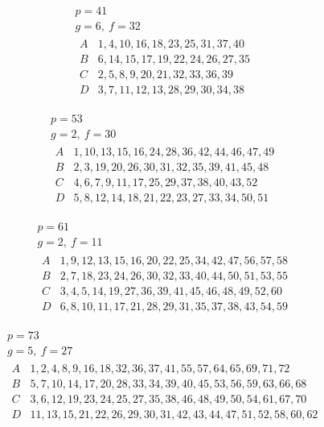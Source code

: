 \[
\begin{gathered}
p=41\\
g=6,\ f=32\\[3pt]
\begin{array}{c|l}
A&1,4,10,16,18,23,25,31,37,40\\
B&6,14,15,17,19,22,24,26,27,35\\
C&2,5,8,9,20,21,32,33,36,39\\
D&3,7,11,12,13,28,29,30,34,38
\end{array}
\end{gathered}
\]

\[
\begin{gathered}
p=53\\
g=2,\ f=30\\[3pt]
\begin{array}{c|l}
A&1,10,13,15,16,24,28,36,42,44,46,47,49\\
B&2,3,19,20,26,30,31,32,35,39,41,45,48\\
C&4,6,7,9,11,17,25,29,37,38,40,43,52\\
D&5,8,12,14,18,21,22,23,27,33,34,50,51
\end{array}
\end{gathered}
\]

\[
\begin{gathered}
p=61\\
g=2,\ f=11\\[3pt]
\begin{array}{c|l}
A&1,9,12,13,15,16,20,22,25,34,42,47,56,57,58\\
B&2,7,18,23,24,26,30,32,33,40,44,50,51,53,55\\
C&3,4,5,14,19,27,36,39,41,45,46,48,49,52,60\\
D&6,8,10,11,17,21,28,29,31,35,37,38,43,54,59
\end{array}
\end{gathered}
\]

\[
\begin{gathered}
p=73\\
g=5,\ f=27\\[3pt]
\begin{array}{c|l}
A&1,2,4,8,9,16,18,32,36,37,41,55,57,64,65,69,71,72\\
B&5,7,10,14,17,20,28,33,34,39,40,45,53,56,59,63,66,68\\
C&3,6,12,19,23,24,25,27,35,38,46,48,49,50,54,61,67,70\\
D&11,13,15,21,22,26,29,30,31,42,43,44,47,51,52,58,60,62
\end{array}
\end{gathered}
\]

